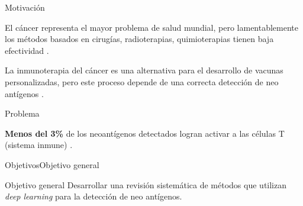 \documentclass[10pt]{beamer}
\newcommand{\1}{
	\setbeamertemplate{background}{
		\texttt{[image: img/1]}
		\tikz[overlay] \fill[fill opacity=0.75,fill=white] (0,0) rectangle (-\paperwidth,\paperheight);
	}
}
\begin{document}
\begin{frame}{Motivación}{}	

\begin{block}{}
	El cáncer representa el mayor problema de salud mundial, pero lamentablemente los métodos basados en cirugías, radioterapias, quimioterapias tienen baja efectividad \cite{peng2019neoantigen}.
\end{block}	

\begin{block}{}
	La inmunoterapia del cáncer es una alternativa para el desarrollo de vacunas personalizadas, pero este proceso depende de una correcta detección de neo antígenos \cite{de2020neoantigen, peng2019neoantigen}.
\end{block}

\end{frame}



\begin{frame}{Problema}{}
	
\begin{block}{}
	\textbf{Menos del 3\%} de los neoantígenos detectados logran activar a las células T (sistema inmune) \cite{de2020neoantigen}. 
\end{block}
	
\end{frame}

\begin{frame}{Objetivos}{Objetivo general}	
	\begin{block}{Objetivo general}
		Desarrollar una revisión sistemática de métodos que utilizan \textit{deep learning} para la detección de neo antígenos.
	\end{block}	
\end{frame}


\end{document}
